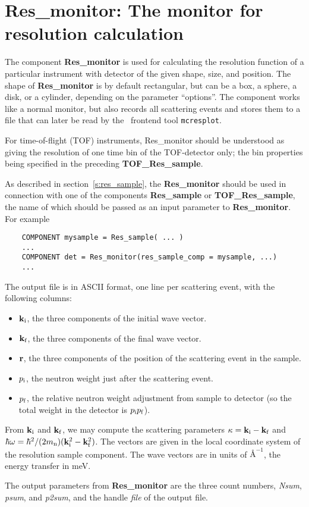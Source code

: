 \section{Res\_monitor: The monitor for resolution calculation}
\label{s:res_monitor}


The component {\bf Res\_monitor} is used for calculating the
resolution function of a particular instrument with detector of the
given shape, size, and position.
The shape of {\bf Res\_monitor} is by default rectangular,
but can be a box, a sphere, a disk, or a cylinder,
depending on the parameter ``options''.
The component works like a normal monitor, but
also records all scattering events and stores
them to a file that can later be read by 
the \MCX\ frontend tool \verb+mcresplot+.

For time-of-flight (TOF) instruments, {Res\_monitor} should be understood 
as giving the resolution of one time bin of the TOF-detector only; 
the bin properties being specified in the preceding {\bf TOF\_Res\_sample}.

As described in section~\ref{s:res_sample},
the {\bf Res\_monitor} should be used in connection with one of the
components {\bf Res\_sample} or {\bf TOF\_Res\_sample}, 
the name of which should be passed as an
input parameter to \textbf{Res\_monitor}. For example
\begin{verbatim}
    COMPONENT mysample = Res_sample( ... )
    ...
    COMPONENT det = Res_monitor(res_sample_comp = mysample, ...)
    ...
\end{verbatim}

The output file is in ASCII format, one line per scattering event, with
the following columns:
\begin{itemize}
\item ${\bf k}_{\rm i}$, the three components of the initial wave vector.
\item ${\bf k}_{\rm f}$, the three components of the final wave vector.
\item ${\bf r}$, the three components of the position of the scattering
  event in the sample.
\item $p_{\rm i}$, the neutron weight just after the scattering event.
\item $p_{\rm f}$, the relative neutron weight adjustment from sample to
  detector (so the total weight in the detector is $p_{\rm i}p_{\rm f}$).
\end{itemize}
From ${\bf k}_{\rm i}$ and ${\bf k}_{\rm f}$, we may compute 
the scattering parameters 
$\kappa = {\bf k}_{\rm i} - {\bf k}_{\rm f}$ and 
$\hbar \omega = \hbar^2/(2 m_{\rm n})({\bf k}_{\rm i}^2 - {\bf k}_{\rm f}^2)$.
The vectors are given in the local coordinate system of the resolution
sample component. The wave vectors are in units of $\mbox{\AA}^{-1}$, the
energy transfer in meV.

The output parameters from {\bf Res\_monitor}
are the three count numbers, \textit{Nsum}, \textit{psum},
and \textit{p2sum}, and the handle \textit{file} of the output file.
